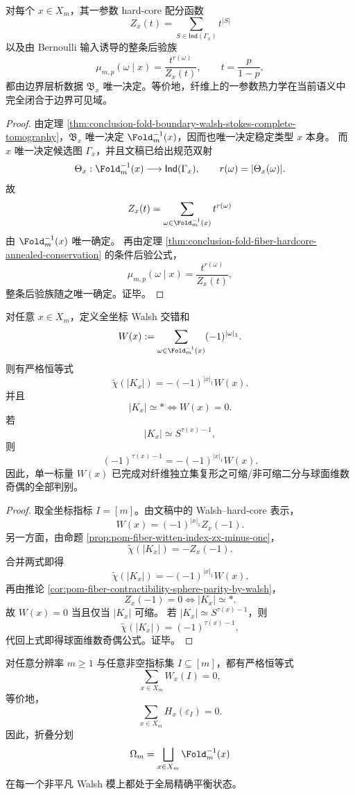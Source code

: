 \begin{theorem}[纤维热力学的边界全息封闭]\label{thm:conclusion-fold-fiber-thermodynamics-boundary-holographic-closure}
对每个 \(x\in X_m\)，其一参数 hard-core 配分函数
\[
Z_x(t)=\sum_{S\in \mathsf{Ind}(\Gamma_x)} t^{|S|}
\]
以及由 Bernoulli 输入诱导的整条后验族
\[
\mu_{m,p}(\omega\mid x)=\frac{t^{r(\omega)}}{Z_x(t)},
\qquad
t=\frac{p}{1-p},
\]
都由边界层析数据 \(\mathfrak B_x\) 唯一决定。等价地，纤维上的一参数热力学在当前语义中完全闭合于边界可见域。
\end{theorem}
\begin{proof}
由定理 \ref{thm:conclusion-fold-boundary-walsh-stokes-complete-tomography}，\(\mathfrak B_x\) 唯一决定 \(\Fold_m^{-1}(x)\)，因而也唯一决定稳定类型 \(x\) 本身。
而 \(x\) 唯一决定候选图 \(\Gamma_x\)，并且文稿已给出规范双射
\[
\Theta_x:\Fold_m^{-1}(x)\longrightarrow \mathsf{Ind}(\Gamma_x),
\qquad
r(\omega)=|\Theta_x(\omega)|.
\]
故
\[
Z_x(t)=\sum_{\omega\in \Fold_m^{-1}(x)} t^{r(\omega)}
\]
由 \(\Fold_m^{-1}(x)\) 唯一确定。
再由定理 \ref{thm:conclusion-fold-fiber-hardcore-annealed-conservation} 的条件后验公式，
\[
\mu_{m,p}(\omega\mid x)=\frac{t^{r(\omega)}}{Z_x(t)},
\]
整条后验族随之唯一确定。证毕。
\end{proof}

\begin{theorem}[边界拓扑读出的判别完备性]\label{thm:conclusion-fold-boundary-topology-readout-completeness}
对任意 \(x\in X_m\)，定义全坐标 Walsh 交错和
\[
W(x):=\sum_{\omega\in \Fold_m^{-1}(x)}(-1)^{|\omega|_1}.
\]
则有严格恒等式
\[
\widetilde\chi(|K_x|)
=
-(-1)^{|x|_1}W(x).
\]
并且
\[
|K_x|\simeq *
\iff
W(x)=0.
\]
若
\[
|K_x|\simeq S^{\tau(x)-1},
\]
则
\[
(-1)^{\tau(x)-1}=-(-1)^{|x|_1}W(x).
\]
因此，单一标量 \(W(x)\) 已完成对纤维独立集复形之可缩/非可缩二分与球面维数奇偶的全部判别。
\end{theorem}
\begin{proof}
取全坐标指标 \(I=[m]\)。由文稿中的 Walsh--hard-core 表示，
\[
W(x)=(-1)^{|x|_1}Z_x(-1).
\]
另一方面，由命题 \ref{prop:pom-fiber-witten-index-zx-minus-one}，
\[
\widetilde\chi(|K_x|)=-Z_x(-1).
\]
合并两式即得
\[
\widetilde\chi(|K_x|)=-(-1)^{|x|_1}W(x).
\]
再由推论 \ref{cor:pom-fiber-contractibility-sphere-parity-by-walsh}，
\[
Z_x(-1)=0 \iff |K_x|\simeq *.
\]
故 \(W(x)=0\) 当且仅当 \(|K_x|\) 可缩。
若 \(|K_x|\simeq S^{\tau(x)-1}\)，则
\[
\widetilde\chi(|K_x|)=(-1)^{\tau(x)-1},
\]
代回上式即得球面维数奇偶公式。证毕。
\end{proof}

\begin{theorem}\label{thm:conclusion-fold-partition-global-walsh-balance}
对任意分辨率 \(m\ge 1\) 与任意非空指标集 \(I\subseteq [m]\)，都有严格恒等式
\[
\sum_{x\in X_m}W_x(I)=0,
\]
等价地，
\[
\sum_{x\in X_m}H_x(\varepsilon_I)=0.
\]
因此，折叠分划
\[
\Omega_m=\bigsqcup_{x\in X_m}\Fold_m^{-1}(x)
\]
在每一个非平凡 Walsh 模上都处于全局精确平衡状态。
\end{theorem}

